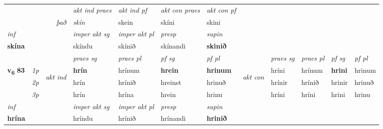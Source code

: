 \begin{longtable}[l]{X>{\footnotesize\itshape}llXXXXlXXXX}
   && &  \textit{akt ind praes} & \textit{akt ind pf} & \textit{akt con praes} & \textit{akt con pf} \\*
\multicolumn{3}{r}{\textit{það}} & skín & skein & skíni & skini \\*

\cmidrule{4-7}
   {\textit{inf}} & &  & \textit{imper akt sg} & \textit{imper akt pl}   & \textit{presp} & \textit{supin}   \\*
  {\textbf{skína}} & && skíndu  & skínið   & skínandi &  \textbf{skinið}   \\*

\midrule

 & &   & \textit{praes sg}  & \textit{praes pl}    & \textit{ pf sg} & \textit{pf pl} & & \textit{praes sg}  & \textit{praes pl}    & \textit{pf sg} & \textit{pf pl }  \\ \cmidrule{4-7} \cmidrule{9-12}
 \multirow{2}{*}{{{\textbf{v{\textsubscript{6}}} \Large{\textbf{83}}}}}  & 1p & \multirow{3}{*}{\begin{turn}{90}\textit{akt ind}\end{turn}} & \textbf{hrín} & hrínum & \textbf{hrein} & \textbf{hrinum} & \multirow{3}{*}{\begin{turn}{90}\textit{akt con}\end{turn}} &hríni & hrínum & \textbf{hrini} & hrinum\\*
 & 2p &  &  hrín  & hrínið & hreinst & hrinuð & & hrínir & hrínið & hrinir & hrinuð \\*
 & 3p &  & hrín & hrína & hrein & hrinu & & hríni & hríni& hrini & hrinu \\*
\cmidrule{4-7} \cmidrule{9-12}

   {\textit{inf}} & &  & \textit{imper akt sg} & \textit{imper akt pl}   & \textit{presp} & \textit{supin}   \\*
  {\textbf{hrína}} & && hríndu  & hrínið   & hrínandi &  \textbf{hrinið}   \\*

\midrule


\end{longtable}
